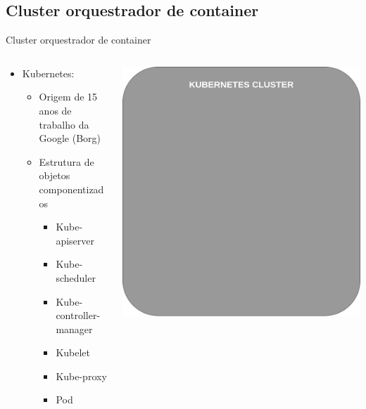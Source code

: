 \documentclass[10pt,brazil]{beamer}
\theoremstyle{definition}
\begin{document}
\subsection{Cluster orquestrador de container}

\begin{frame}{Cluster orquestrador de container}
  \begin{columns}
    \begin{column}{0.5\textwidth}
      \begin{itemize}
        \item Kubernetes\textregistered:
          \begin{itemize}
            \item Origem de 15 anos de trabalho da Google (Borg) %
            \item Estrutura de objetos componentizados %
              \begin{itemize}
                \item Kube-apiserver
                \item Kube-scheduler
                \item Kube-controller-manager
                \item Kubelet
                \item Kube-proxy
                \item Pod
              \end{itemize}
          \end{itemize}
      \end{itemize}
    \end{column}
    \begin{column}{0.5\textwidth}  %
      \begin{center}
        \begin{overprint}
          \includegraphics[width=1\textwidth]{k8s-1.png}

\end{overprint}
\end{center}
\end{column}
\end{columns}
\end{frame}
\end{document}
